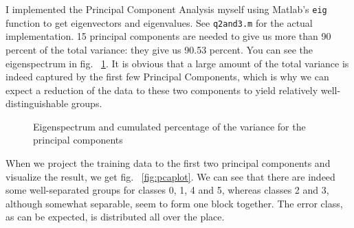 \documentclass{article}
\begin{document}
I implemented the Principal Component Analysis myself using Matlab's \texttt{eig} function to get eigenvectors and eigenvalues. See \texttt{q2and3.m} for the actual implementation. 15 principal components are needed to give us more than 90 percent of the total variance: they give us 90.53 percent. You can see the eigenspectrum in fig. ~\ref{fig:eigenspectrum}. It is obvious that a large amount of the total variance is indeed captured by the first few Principal Components, which is why we can expect a reduction of the data to these two components to yield relatively well-distinguishable groups.
\begin{figure}


  \caption{Eigenspectrum and cumulated percentage of the variance for the principal components}
  \label{fig:eigenspectrum}
\end{figure}

When we project the training data to the first two principal components and visualize the result, we get fig. ~\ref{fig:pcaplot}. We can see that there are indeed some well-separated groups for classes 0, 1, 4 and 5, whereas classes 2 and 3, although somewhat separable, seem to form one block together. The error class, as can be expected, is distributed all over the place.
\end{document}
